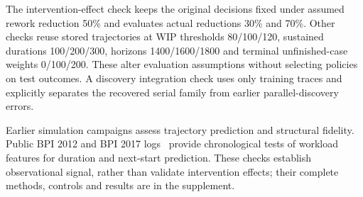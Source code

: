 The intervention-effect check keeps the original decisions fixed under assumed rework reduction 50\% and evaluates actual reductions 30\% and 70\%. Other checks reuse stored trajectories at WIP thresholds 80/100/120, sustained durations 100/200/300, horizons 1400/1600/1800 and terminal unfinished-case weights 0/100/200. These alter evaluation assumptions without selecting policies on test outcomes. A discovery integration check uses only training traces and explicitly separates the recovered serial family from earlier parallel-discovery errors.

Earlier simulation campaigns assess trajectory prediction and structural fidelity. Public BPI 2012 and BPI 2017 logs~\cite{bpi12,bpi17} provide chronological tests of workload features for duration and next-start prediction. These checks establish observational signal, rather than validate intervention effects; their complete methods, controls and results are in the supplement.
